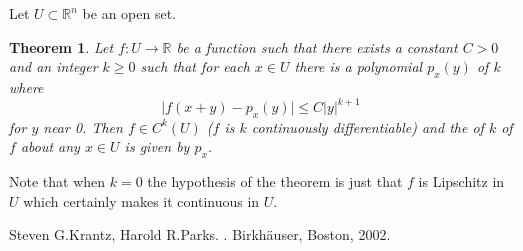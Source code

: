 \documentclass[12pt]{article}
\theoremstyle{theorem}
\newtheorem*{thm}{Theorem}
\theoremstyle{definition}
\begin{document}
Let $U \subset {\mathbb{R}}^n$ be an open set.

\begin{thm}
Let $f \colon U \to {\mathbb{R}}$ be a function such that there exists a constant $C > 0$ and an integer $k \geq 0$ such that for each $x \in U$ there is a polynomial $p_x(y)$ of  $k$ where
\begin{equation*}
\lvert f(x+y) - p_x(y) \rvert \leq C \lvert y \rvert^{k+1}
\end{equation*}
for $y$ near 0.  Then $f \in C^k(U)$ ($f$ is $k$  continuously differentiable) and the  of  $k$ of $f$ about any $x \in U$ is given by $p_x$.
\end{thm}

Note that when $k=0$ the hypothesis of the theorem is just that $f$ is Lipschitz in $U$ which certainly makes it continuous in $U$.

\begin{thebibliography}{9}
Steven G.\@ Krantz, Harold R.\@ Parks.
{\em {}}.
Birkh\"{a}user, Boston, 2002.
\end{thebibliography}
\end{document}
